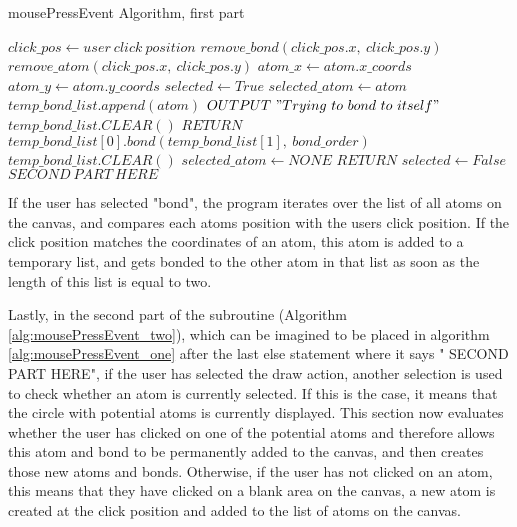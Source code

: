 \documentclass[a4paper,12pt]{article}
\begin{document}
\begin{algorithm}
\footnotesize
\caption{mousePressEvent Algorithm, first part}\label{alg:mousePressEvent_one}
\begin{algorithmic}
	\State $ click\_pos\gets user\ click\ position$
		\State $ remove\_bond(click\_pos.x,\ click\_pos.y)$
		\State $ remove\_atom(click\_pos.x,\ click\_pos.y)$
			\State $ atom\_x\gets atom.x\_coords$
			\State $ atom\_y\gets atom.y\_coords$
				\State $ selected\gets True$
				\State $ selected\_atom\gets atom$
				\State $ temp\_bond\_list.append(atom)$
						\State $ OUTPUT\ "Trying\ to\ bond\ to\ itself"$
						\State $ temp\_bond\_list.CLEAR()$
						\State $ RETURN$
					\EndIf
					\State $ temp\_bond\_list[0].bond(temp\_bond\_list[1],\ bond\_order)$
					\State $ temp\_bond\_list.CLEAR()$
					\State $ selected\_atom\gets NONE$
				\EndIf
				\State $ RETURN$
			\EndIf
			\State $ selected\gets False$
		\EndFor
	\Else
		\State $ SECOND\ PART\ HERE$
	\EndIf
\EndIf
\EndFunction
\end{algorithmic}
\end{algorithm}

If the user has selected "bond", the program iterates over the list of all atoms on the canvas, and compares each atoms position with the users click position. If the click position matches the coordinates of an atom, this atom is added to a temporary list, and gets bonded to the other atom in that list as soon as the length of this list is equal to two.

\newpage

Lastly, in the second part of the subroutine (Algorithm \ref{alg:mousePressEvent_two}), which can be imagined to be placed in algorithm \ref{alg:mousePressEvent_one} after the last else statement where it says " SECOND PART HERE", if the user has selected the draw action, another selection is used to check whether an atom is currently selected. If this is the case, it means that the circle with potential atoms is currently displayed. This section now evaluates whether the user has clicked on one of the potential atoms and therefore allows this atom and bond to be permanently added to the canvas, and then creates those new atoms and bonds. Otherwise, if the user has not clicked on an atom, this means that they have clicked on a blank area on the canvas, a new atom is created at the click position and added to the list of atoms on the canvas.
\end{document}
